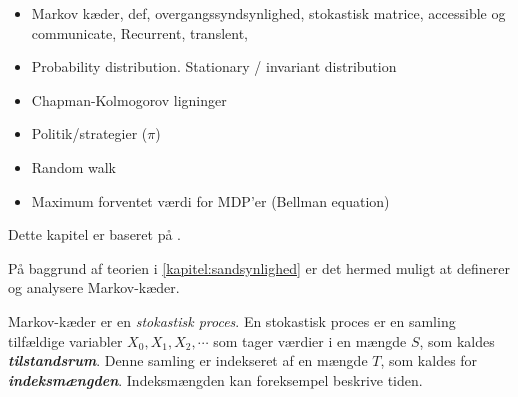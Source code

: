 \begin{itemize}
    \item Markov kæder, def, overgangssyndsynlighed, stokastisk matrice, accessible og communicate, Recurrent, translent, 
    \item Probability distribution. Stationary / invariant distribution
    \item Chapman-Kolmogorov ligninger
    \item Politik/strategier ($\pi$)
    \item Random walk
    \item Maximum forventet værdi for MDP’er (Bellman equation)
\end{itemize}

Dette kapitel er baseret på \cite[s.]{olofsson2005probability}.

På baggrund af teorien i \autoref{kapitel:sandsynlighed} er det hermed muligt at definerer og analysere Markov-kæder. 

Markov-kæder er en \textit{stokastisk proces}. En stokastisk proces er en samling tilfældige variabler $X_0, X_1, X_2, \cdots$ som tager værdier i en mængde $S$, som kaldes \textbf{\textit{tilstandsrum}}. Denne samling er indekseret af en  mængde $T$, som kaldes for \textbf{\textit{indeksmængden}}. Indeksmængden kan foreksempel beskrive tiden.  

